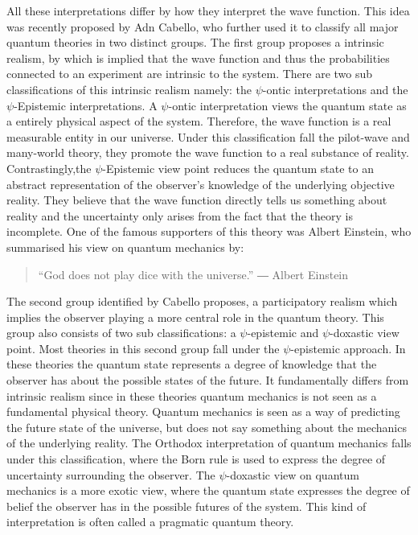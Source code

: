 \documentclass[11pt, a4 paper]{article}
\begin{document}
\begin{multicols}{2}
All these interpretations differ by how they interpret the wave function. This idea was recently proposed by Adn Cabello\cite{classific}, who further used it to classify all major quantum theories in two distinct groups. The first group proposes a intrinsic realism, by which is implied that the wave function and thus the probabilities connected to an experiment are intrinsic to the system. There are two sub classifications of this intrinsic realism namely: the $\psi$-ontic interpretations and the $\psi$-Epistemic interpretations. A $\psi$-ontic interpretation views the quantum state as a entirely physical aspect of the system. Therefore, the wave function is a real measurable entity in our universe. Under this classification fall the pilot-wave and many-world theory, they promote the wave function to a real substance of reality. Contrastingly,the $\psi$-Epistemic view point reduces the quantum state to an abstract representation of the observer's knowledge of the underlying objective reality. They believe that the wave function directly tells us something about reality and the uncertainty only arises from the fact that the theory is incomplete. One of the famous supporters of this theory was Albert Einstein, who summarised his view on quantum mechanics by:
\begin{quote}
    ``God does not play dice with the universe.''\newline
    ― Albert Einstein  \cite{dice}
\end{quote}
The second group identified by Cabello proposes, a participatory realism  which implies the observer playing a more central role in the quantum theory. This group also consists of two sub classifications: a $\psi$-epistemic and $\psi$-doxastic view point. Most theories in this second group fall under the $\psi$-epistemic approach. In these theories the quantum state represents a degree of knowledge that the observer has about the possible states of the future. It fundamentally differs from intrinsic realism since in these theories quantum mechanics is not seen as a fundamental physical theory. Quantum mechanics is seen as a way of predicting the future state of the universe, but does not say something about the mechanics of the underlying reality. The Orthodox interpretation of quantum mechanics falls under this classification, where the Born rule is used to express the degree of uncertainty surrounding the observer. The $\psi$-doxastic view on quantum mechanics is a more exotic view, where the quantum state expresses the degree of belief the observer has in the possible futures of the system. This kind of interpretation is often called a pragmatic quantum theory.\\

\end{multicols}
\end{document}
